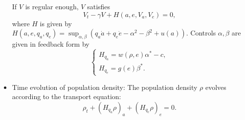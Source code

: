 \documentclass{article}
\begin{document}
\begin{itemize}
    If $V$ is regular enough, $V$ satisfies 
    $$
    V_t - \gamma V + H(a,e,V_a, V_e) = 0,
    $$
    where $H$ is given by
    $H(a,e,q_a, q_e) = \sup_{\alpha, \beta} \left( q_a {\dot a} + q_e {\dot e}  - \alpha^2 - \beta^2 + u(a) \right)$.
    Controls $\alpha, \beta$ are given in feedback form by 
    \begin{equation}
        \begin{cases}
            H_{q_a} = w(\rho, e) \alpha^* - c,\\
            H_{q_e} = g(e) \beta^*.
        \end{cases}
    \end{equation}
    \item Time evolution of population density: The population density $\rho$ evolves according to the transport equation:
    \begin{equation}
        \rho_t + (H_{q_a} \rho)_a + (H_{q_e} \rho)_e = 0.
    \end{equation}   
\end{itemize}
\end{document}

